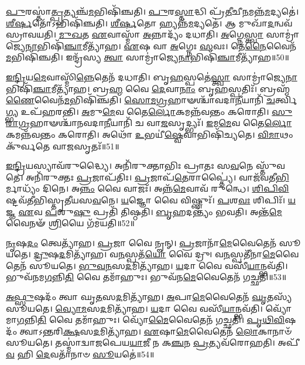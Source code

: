 \-\ul{𑌪𑍁}\-𑌰𑌸𑍍𑌤𑌾॑\-\ul{𑌤𑍍𑌪𑍍𑌰}\-𑌤𑍍𑌯𑌞𑍍𑌚᳴\-\ul{𑌮}\-𑌭𑌿𑌷𑌿᳴𑌞𑍍𑌚𑌤𑌿।
\-\ul{𑌪𑍁}\-𑌰\-\ul{𑌸𑍍𑌤𑌾}\-𑌦𑍍𑌧𑌿 𑌪𑍍𑌰᳴\-\ul{𑌤𑍀}\-𑌚𑍀\-\ul{𑌨}\-𑌮𑌨𑍍𑌨᳴\-\ul{𑌮}\-𑌦𑍍𑌯𑌤𑍇॑।
\-\ul{𑌶𑍀}\-\-\ul{𑌰𑍍}\-\-\ul{𑌷}\-𑌤𑍋᳴\-𑌽𑌭𑌿𑌷𑌿᳴𑌞𑍍𑌚𑌤𑌿।
\-\ul{𑌶𑍀}\-\-\ul{𑌰𑍍}\-\-\ul{𑌷}\-𑌤𑍋 𑌹𑍍𑌯𑌨𑍍𑌨᳴\-\ul{𑌮}\-𑌦𑍍𑌯𑌤𑍇॑।
𑌆 𑌮𑍁𑌖𑌾᳴\-\ul{𑌦}\-𑌨𑍍𑌵𑌵᳴\-𑌸𑍍𑌰𑌾𑌵𑌯𑌤𑌿।
\-\ul{𑌮𑍁}\-\-\ul{𑌖}\-𑌤 \ul{𑌏}\-𑌵𑌾𑌸𑍍𑌮𑌾᳴ \ul{𑌅}\-𑌨𑍍𑌨𑌾𑌦𑍍𑌯𑌂᳴ 𑌦𑌧𑌾𑌤𑌿।
\-\ul{𑌅}\-𑌗𑍍𑌨𑍇\-\ul{𑌸𑍍𑌤𑍍𑌵𑌾} 𑌸𑌾𑌮𑍍𑌰𑌾॑𑌜𑍍𑌯𑍇\-\ul{𑌨𑌾}\-\-𑌭𑌿𑌷𑌿᳴\-\ul{𑌞𑍍𑌚𑌾}\-𑌮𑍀\-𑌤𑍍𑌯𑌾᳴𑌹।
\-\ul{𑌏}\-𑌷 𑌵𑌾 \ul{𑌅}\-𑌗𑍍𑌨𑍇𑌃 \ul{𑌸}\-𑌵𑌃।
𑌤𑍇\-\ul{𑌨𑍈}\-𑌵𑍈𑌨᳴\-\ul{𑌮}\-𑌭𑌿\-𑌷𑌿᳴𑌞𑍍𑌚𑌤𑌿।
𑌇𑌨𑍍𑌦𑍍𑌰᳴𑌸𑍍𑌯 \ul{𑌤𑍍𑌵𑌾} 𑌸𑌾𑌮𑍍𑌰𑌾॑𑌜𑍍𑌯𑍇\-\ul{𑌨𑌾}\-\-𑌭𑌿𑌷𑌿᳴\-\ul{𑌞𑍍𑌚𑌾}\-𑌮𑍀\-𑌤𑍍𑌯𑌾᳴𑌹॥50॥

\-\ul{𑌇}\-\-\ul{𑌨𑍍𑌦𑍍𑌰𑌿}\-𑌯\-\ul{𑌮𑍇}\-𑌵𑌾𑌸𑍍𑌮𑌿᳴\-\ul{𑌨𑍍𑌨𑍇}\-𑌤𑍇𑌨᳴ 𑌦𑌧𑌾𑌤𑌿।
𑌬𑍃\-\ul{𑌹}\-𑌸𑍍𑌪𑌤𑍇॑\-\ul{𑌸𑍍𑌤𑍍𑌵𑌾} 𑌸𑌾𑌮𑍍𑌰𑌾॑𑌜𑍍𑌯𑍇\-\ul{𑌨𑌾}\-𑌭𑌿\-𑌷𑌿᳴\-\ul{𑌞𑍍𑌚𑌾}\-𑌮𑍀𑌤𑍍𑌯𑌾᳴𑌹।
𑌬𑍍𑌰\-\ul{𑌹𑍍𑌮} 𑌵𑍈 \ul{𑌦𑍇}\-𑌵𑌾\-\ul{𑌨𑌾𑌂} 𑌬𑍃\-\ul{𑌹}\-𑌸𑍍𑌪𑌤𑌿𑌃᳴।
𑌬𑍍𑌰𑌹𑍍𑌮᳴\-\ul{𑌣𑍈}\-𑌵𑍈𑌨᳴\-\ul{𑌮}\-𑌭𑌿\-𑌷𑌿᳴𑌞𑍍𑌚𑌤𑌿।
\-\ul{𑌸𑍋}\-\-\ul{𑌮}\-\-\ul{𑌗𑍍𑌰}\-𑌹𑌾𑍟𑌶𑍍𑌚𑌾᳴𑌵𑌦𑌾\-\ul{𑌨𑍀}\-𑌯𑌾𑌨𑌿᳴ \ul{𑌚}\-𑌰𑍍𑌤𑍍𑌵𑌿\-\ul{𑌗𑍍𑌭𑍍𑌯} 𑌉𑌪᳴𑌹𑌰𑌨𑍍𑌤𑌿।
\-\ul{𑌅}\-𑌮𑍁\-\ul{𑌮𑍇}\-𑌵 𑌤𑍈\-\ul{𑌰𑍍𑌲𑍋}\-𑌕𑌮𑌨𑍍𑌨᳴𑌵𑌨𑍍𑌤𑌂 𑌕𑌰𑍋𑌤𑌿।
\-\ul{𑌸𑍁}\-\-\ul{𑌰𑌾}\-\-\ul{𑌗𑍍𑌰}\-𑌹𑌾𑍟𑌶𑍍𑌚𑌾᳴𑌨𑌵𑌦𑌾\-\ul{𑌨𑍀}\-\-𑌯𑌾𑌨𑌿᳴ 𑌚 𑌵𑌾\-\ul{𑌜}\-𑌸𑍃𑌦𑍍𑌭𑍍𑌯𑌃᳴।
\-\ul{𑌇}\-𑌮\-\ul{𑌮𑍇}\-𑌵 𑌤𑍈\-\ul{𑌰𑍍𑌲𑍋}\-𑌕𑌮𑌨𑍍𑌨᳴𑌵𑌨𑍍𑌤𑌂 𑌕𑌰𑍋𑌤𑌿।
𑌅𑌥𑍋᳴ \ul{𑌉}\-𑌭𑌯𑍀॑\-\ul{𑌷𑍍𑌵𑍇}\-𑌵𑌾𑌭𑌿𑌷𑌿᳴𑌚𑍍𑌯𑌤𑍇।
\-\ul{𑌵𑌿}\-\-\ul{𑌮𑌾}\-𑌥𑌂 𑌕𑍁᳴𑌰𑍍𑌵𑌤𑍇 𑌵𑌾\-\ul{𑌜}\-𑌸𑍃𑌤𑌃᳴॥51॥

\-\ul{𑌇}\-\-\ul{𑌨𑍍𑌦𑍍𑌰𑌿}\-𑌯𑌸𑍍𑌯𑌾𑌵᳴𑌰𑍁𑌦𑍍𑌧𑍍𑌯𑍈।
𑌅𑌨𑌿᳴𑌰𑍁𑌕𑍍𑌤𑌾𑌭𑌿𑌃 𑌪𑍍𑌰𑌾𑌤𑌃 𑌸\-\ul{𑌵}\-𑌨𑍇 𑌸𑍍𑌤𑍁᳴𑌵𑌤𑍇।
𑌅𑌨𑌿᳴𑌰𑍁𑌕𑍍𑌤𑌃 \ul{𑌪𑍍𑌰}\-𑌜𑌾\-𑌪᳴𑌤𑌿𑌃।
\-\ul{𑌪𑍍𑌰}\-𑌜𑌾𑌪᳴\-\ul{𑌤𑍇}\-𑌰𑌾𑌪𑍍𑌤𑍍𑌯𑍈॑।
𑌵𑌾𑌜᳴𑌵𑌤𑍀\-\ul{𑌭𑌿}\-𑌰𑍍𑌮𑌾𑌧𑍍𑌯𑌂᳴ 𑌦𑌿𑌨𑍇।
𑌅\-\ul{𑌨𑍍𑌨𑌂} 𑌵𑍈 𑌵𑌾𑌜𑌃᳴।
𑌅𑌨𑍍𑌨᳴\-\ul{𑌮𑍇}\-𑌵𑌾𑌵᳴ 𑌰𑍁𑌨𑍍𑌧𑍇।
\-\ul{𑌶𑌿}\-\-\ul{𑌪𑌿}\-\-\ul{𑌵𑌿}\-𑌷𑍍𑌟\-𑌵᳴𑌤𑍀𑌭𑌿𑌸𑍍𑌤𑍃𑌤𑍀𑌯𑌸\-\ul{𑌵}\-𑌨𑍇।
\-\ul{𑌯}\-𑌜𑍍𑌞𑍋 𑌵𑍈 𑌵𑌿𑌷𑍍𑌣𑍁𑌃᳴।
\-\ul{𑌪}\-𑌶\-\ul{𑌵𑌃} 𑌶𑌿𑌪𑌿𑌃᳴।
\-\ul{𑌯}\-𑌜𑍍𑌞 \ul{𑌏}\-𑌵 \ul{𑌪}\-𑌶𑍁\-\ul{𑌷𑍁} 𑌪𑍍𑌰𑌤𑌿᳴ 𑌤𑌿𑌷𑍍𑌠𑌤𑌿।
\-\ul{𑌬𑍃}\-𑌹𑌦𑌨𑍍𑌤𑍍𑌯𑌂᳴ 𑌭𑌵𑌤𑌿।
𑌅𑌨𑍍𑌤᳴\-\ul{𑌮𑍇}\-𑌵𑍈𑌨𑍟᳴ \ul{𑌶𑍍𑌰𑌿}\-𑌯𑍈 𑌗᳴𑌮𑌯𑌤𑌿॥52॥\anuvakamend[\-\ul{𑌅}\-\-\ul{𑌶𑍍𑌞𑍀}\-𑌯𑌾𑌦𑌨𑍍𑌨᳴𑌸𑍍𑌯𑌾\-\ul{𑌨𑍍𑌨}\-𑌸𑍍𑌯𑌾𑌵᳴𑌰𑍁\-\ul{𑌦𑍍𑌧𑍍𑌯𑌾} 𑌇𑌨𑍍𑌦𑍍𑌰᳴𑌸𑍍𑌯 \ul{𑌤𑍍𑌵𑌾} 𑌸𑌾𑌮𑍍𑌰𑌾॑𑌜𑍍𑌯𑍇\-\ul{𑌨𑌾}\-𑌭𑌿𑌷𑌿᳴\-\ul{𑌞𑍍𑌚𑌾}\-𑌮𑍀𑌤𑍍𑌯𑌾᳴𑌹 𑌵𑌾\-\ul{𑌜}\-𑌸𑍃\-\ul{𑌤𑌃} 𑌶𑌿\-\ul{𑌪𑌿}\-𑌸𑍍𑌤𑍍𑌰𑍀𑌣𑌿᳴ 𑌚]

\-\ul{𑌨𑍃}\-𑌷\-\ul{𑌦𑌂} 𑌤𑍍𑌵𑍇𑌤𑍍𑌯𑌾᳴𑌹।
\-\ul{𑌪𑍍𑌰}\-𑌜𑌾 𑌵𑍈 𑌨𑍄𑌨𑍍।
\-\ul{𑌪𑍍𑌰}\-𑌜𑌾𑌨𑌾᳴\-\ul{𑌮𑍇}\-𑌵𑍈𑌤𑍇𑌨᳴ 𑌸𑍂𑌯𑌤𑍇।
\-\ul{𑌦𑍍𑌰𑍁}\-𑌷\-\ul{𑌦}\-𑌮𑌿𑌤𑍍𑌯𑌾᳴𑌹।
𑌵\-\ul{𑌨}\-𑌸𑍍𑌪𑌤᳴\-\ul{𑌯𑍋} 𑌵𑍈 𑌦𑍍𑌰𑍁।
𑌵\-\ul{𑌨}\-𑌸𑍍𑌪𑌤𑍀᳴𑌨𑌾\-\ul{𑌮𑍇}\-𑌵𑍈𑌤𑍇𑌨᳴ 𑌸𑍂𑌯𑌤𑍇।
\-\ul{𑌭𑍁}\-\-\ul{𑌵}\-\-\ul{𑌨}\-𑌸\-\ul{𑌦}\-𑌮𑌿𑌤𑍍𑌯𑌾᳴𑌹।
\-\ul{𑌯}\-𑌦𑌾 𑌵𑍈 𑌵𑌸𑍀᳴\-\ul{𑌯𑌾}\-𑌨𑍍𑌭𑌵᳴𑌤𑌿।
𑌭𑍁𑌵᳴𑌨𑌮\-\ul{𑌗}\-𑌨𑍍𑌨𑌿\-\ul{𑌤𑌿} 𑌵𑍈 𑌤𑌮𑌾᳴𑌹𑍁𑌃।
𑌭𑍁𑌵᳴𑌨\-\ul{𑌮𑍇}\-𑌵𑍈𑌤𑍇𑌨᳴ 𑌗𑌚𑍍𑌛𑌤𑌿॥53॥

\-\ul{𑌅}\-\-\ul{𑌫𑍍𑌸𑍁}\-𑌷𑌦𑌂᳴ 𑌤𑍍𑌵𑌾 𑌘𑍃\-\ul{𑌤}\-𑌸\-\ul{𑌦}\-𑌮𑌿𑌤𑍍𑌯𑌾᳴𑌹।
\-\ul{𑌅}\-𑌪𑌾\-\ul{𑌮𑍇}\-𑌵𑍈𑌤𑍇𑌨᳴ \ul{𑌘𑍃}\-𑌤𑌸𑍍𑌯᳴ 𑌸𑍂𑌯𑌤𑍇।
\-\ul{𑌵𑍍𑌯𑍋}\-\-\ul{𑌮}\-𑌸\-\ul{𑌦}\-𑌮𑌿𑌤𑍍𑌯𑌾᳴𑌹।
\-\ul{𑌯}\-𑌦𑌾 𑌵𑍈 𑌵𑌸𑍀᳴\-\ul{𑌯𑌾}\-𑌨𑍍𑌭𑌵᳴𑌤𑌿।
𑌵𑍍𑌯𑍋᳴𑌮𑌾\-\ul{𑌗}\-𑌨𑍍𑌨𑌿\-\ul{𑌤𑌿} 𑌵𑍈 𑌤𑌮𑌾᳴𑌹𑍁𑌃।
𑌵𑍍𑌯𑍋᳴\-\ul{𑌮𑍈}\-𑌵𑍈𑌤𑍇𑌨᳴ 𑌗𑌚𑍍𑌛𑌤𑌿।
\-\ul{𑌪𑍃}\-\-\ul{𑌥𑌿}\-\-\ul{𑌵𑌿}\-𑌷𑌦𑌂᳴ 𑌤𑍍𑌵𑌾\-𑌽𑌨𑍍𑌤𑌰𑌿\-\ul{𑌕𑍍𑌷}\-𑌸\-\ul{𑌦}\-𑌮𑌿𑌤𑍍𑌯𑌾᳴𑌹।
\-\ul{𑌏}\-𑌷𑌾\-\ul{𑌮𑍇}\-𑌵𑍈𑌤𑍇𑌨᳴ \ul{𑌲𑍋}\-𑌕𑌾𑌨𑌾𑍞᳴ 𑌸𑍂𑌯𑌤𑍇।
𑌤𑌸𑍍𑌮𑌾॑𑌦𑍍𑌵𑌾𑌜𑌪𑍇𑌯\-\ul{𑌯𑌾}\-𑌜𑍀 𑌨 𑌕\-\ul{𑌞𑍍𑌚}\-𑌨 \ul{𑌪𑍍𑌰}\-𑌤𑍍𑌯𑌵᳴𑌰𑍋𑌹𑌤𑌿।
𑌅𑌪𑍀᳴\-\ul{𑌵} 𑌹𑌿 \ul{𑌦𑍇}\-𑌵𑌤𑌾᳴𑌨𑌾𑍞 \ul{𑌸𑍂}\-𑌯𑌤𑍇॑॥54॥

